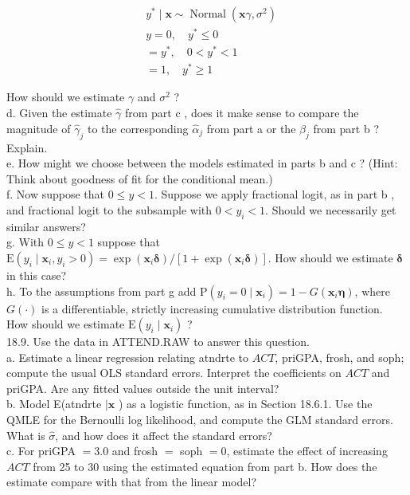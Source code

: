 \documentclass[10pt]{article}
\begin{document}
$$
\begin{aligned}
& y^{*} \mid \mathbf{x} \sim \operatorname{Normal}\left(\mathbf{x} \gamma, \sigma^{2}\right) \\
& y=0, \quad y^{*} \leq 0 \\
& =y^{*}, \quad 0<y^{*}<1 \\
& =1, \quad y^{*} \geq 1
\end{aligned}
$$

How should we estimate $\gamma$ and $\sigma^{2}$ ?\\
d. Given the estimate $\hat{\gamma}$ from part c , does it make sense to compare the magnitude of $\hat{\gamma}_{j}$ to the corresponding $\hat{\alpha}_{j}$ from part a or the $\hat{\beta}_{j}$ from part b ? Explain.\\
e. How might we choose between the models estimated in parts b and c ? (Hint: Think about goodness of fit for the conditional mean.)\\
f. Now suppose that $0 \leq y<1$. Suppose we apply fractional logit, as in part b , and fractional logit to the subsample with $0<y_{i}<1$. Should we necessarily get similar answers?\\
g. With $0 \leq y<1$ suppose that $\mathrm{E}\left(y_{i} \mid \mathbf{x}_{i}, y_{i}>0\right)=\exp \left(\mathbf{x}_{i} \boldsymbol{\delta}\right) /\left[1+\exp \left(\mathbf{x}_{i} \boldsymbol{\delta}\right)\right]$. How should we estimate $\boldsymbol{\delta}$ in this case?\\
h. To the assumptions from part g add $\mathrm{P}\left(y_{i}=0 \mid \mathbf{x}_{i}\right)=1-G\left(\mathbf{x}_{i} \boldsymbol{\eta}\right)$, where $G(\cdot)$ is a differentiable, strictly increasing cumulative distribution function. How should we estimate $\mathrm{E}\left(y_{i} \mid \mathbf{x}_{i}\right)$ ?\\
18.9. Use the data in ATTEND.RAW to answer this question.\\
a. Estimate a linear regression relating atndrte to $A C T$, priGPA, frosh, and soph; compute the usual OLS standard errors. Interpret the coefficients on $A C T$ and priGPA. Are any fitted values outside the unit interval?\\
b. Model E(atndrte $\mid \mathbf{x}$ ) as a logistic function, as in Section 18.6.1. Use the QMLE for the Bernoulli log likelihood, and compute the GLM standard errors. What is $\hat{\sigma}$, and how does it affect the standard errors?\\
c. For priGPA $=3.0$ and frosh $=$ soph $=0$, estimate the effect of increasing $A C T$ from 25 to 30 using the estimated equation from part b. How does the estimate compare with that from the linear model?\\
\end{document}
